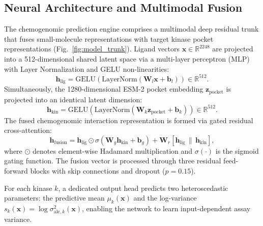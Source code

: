 \documentclass[journal]{IEEEtran}
\begin{document}
\subsection{Neural Architecture and Multimodal Fusion}
The chemogenomic prediction engine comprises a multimodal deep residual trunk that fuses small-molecule representations with target kinase pocket representations (Fig.~\ref{fig:model_trunk}). Ligand vectors $\mathbf{x} \in \mathbb{R}^{2248}$ are projected into a 512-dimensional shared latent space via a multi-layer perceptron (MLP) with Layer Normalization and GELU non-linearities:
\begin{equation}
    \mathbf{h}_{\text{lig}} = \text{GELU}(\text{LayerNorm}(\mathbf{W}_l \mathbf{x} + \mathbf{b}_l)) \in \mathbb{R}^{512}.
\end{equation}
Simultaneously, the 1280-dimensional ESM-2 pocket embedding $\mathbf{z}_{\text{pocket}}$ is projected into an identical latent dimension:
\begin{equation}
    \mathbf{h}_{\text{kin}} = \text{GELU}(\text{LayerNorm}(\mathbf{W}_k \mathbf{z}_{\text{pocket}} + \mathbf{b}_k)) \in \mathbb{R}^{512}.
\end{equation}
The fused chemogenomic interaction representation is formed via gated residual cross-attention:
\begin{equation}
    \mathbf{h}_{\text{fusion}} = \mathbf{h}_{\text{lig}} \odot \sigma(\mathbf{W}_g \mathbf{h}_{\text{kin}} + \mathbf{b}_g) + \mathbf{W}_r [\mathbf{h}_{\text{lig}} \,\|\, \mathbf{h}_{\text{kin}}],
\end{equation}
where $\odot$ denotes element-wise Hadamard multiplication and $\sigma(\cdot)$ is the sigmoid gating function. The fusion vector is processed through three residual feed-forward blocks with skip connections and dropout ($p=0.15$).

For each kinase $k$, a dedicated output head predicts two heteroscedastic parameters: the predictive mean $\mu_k(\mathbf{x})$ and the log-variance $s_k(\mathbf{x}) = \log \sigma_{\text{ale}, k}^2(\mathbf{x})$, enabling the network to learn input-dependent assay variance.
\end{document}
